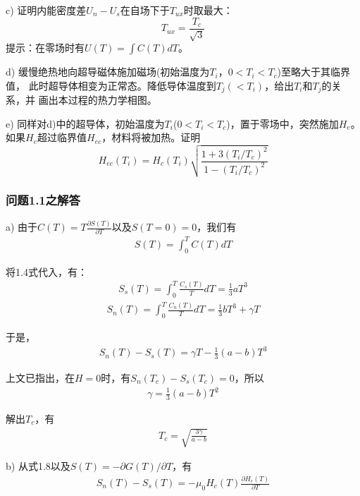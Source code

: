 c) 证明内能密度差$U_n-U_s$在自场下于$T_{ux}$时取最大：
\begin{equation}
  T_{ux}=\frac{T_c}{\sqrt{3}}
\end{equation}
提示：在零场时有$U(T)=\int C(T)dT$。

d) 缓慢绝热地向超导磁体施加磁场(初始温度为$T_i$，$0<T_i<T_c$)至略大于其临界值，
此时超导体相变为正常态。降低导体温度到$T_j (<T_i)$，给出$T_i$和$T_j$的关系，并
画出本过程的热力学相图。

e) 同样对d)中的超导体，初始温度为$T_i$($0<T_i<T_c$)，置于零场中，突然施加$H_e$。
如果$H_e$超过临界值$H_{ec}$，材料将被加热。证明
\begin{equation}
  H_{ec}(T_i)=H_c(T _i)\sqrt{\frac{1+3(T_i/T_c)^2}{1-(T_i/T_c)^2}}
\end{equation}

\subsubsection{问题1.1之解答}
a) 由于$C(T)=T\frac{\partial S(T)}{\partial T}$以及$S(T=0)=0$，我们有
\begin{align*}
S(T) =\int_{0}^{T}C(T)dT \tag{S1.1} 
\end{align*} 

将1.4式代入，有：
\begin{align*}
S_s(T) =\int_{0}^{T}\frac{C_s(T)}{T}dT=\frac{1}{3}aT^3 \tag{S1.2a}
\end{align*} 
\begin{align*}
S_n(T) =\int_{0}^{T}\frac{C_n(T)}{T}dT = \frac{1}{3}bT^3 + \gamma T \tag{S1.2b}
\end{align*} 

于是，
\begin{align*}
S_n(T) − S_s(T) =\gamma T − \frac{1}{3} (a − b)T^3\tag{S1.3}
\end{align*} 

上文已指出，在$H=0$时，有$S_n(T_c)−S_s(T_c)=0$，所以
\begin{align*}
\gamma= \frac{1}{3} (a − b)T^2 \tag{S1.4}
\end{align*}

解出$T_c$，有
\begin{align*}
T_c=\sqrt{\frac{3\gamma}{a-b}} \tag{1.5}
\end{align*}

b) 从式1.8以及$S(T)=−\partial G(T)/\partial T$，有
\begin{align*}
S_n(T) − S_s(T) = −\mu_0 H_c(T)\frac{\partial H_c(T)}{\partial T}\tag{S1.5}
\end{align*}

